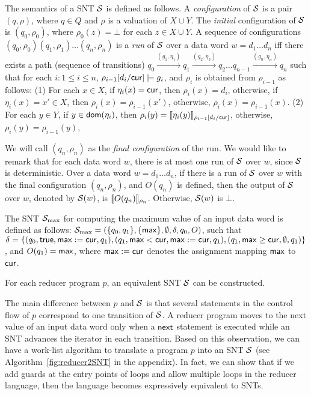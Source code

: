 The semantics of a SNT ${\mathcal{S} }$  is defined as follows. A \emph{configuration} of ${\mathcal{S} }$ is a pair $(q,\rho)$, where $q \in Q$ and $\rho$ is a valuation of $X \cup Y$. The \emph{initial} configuration of ${\mathcal{S} }$ is $(q_0,\rho_0)$, where $\rho_0(z)=\bot$ for each $z \in X\cup Y$.
A sequence of configurations $(q_0,\rho_0)(q_1,\rho_1)\ldots(q_n,\rho_n)$ is
a \emph{run} of ${\mathcal{S} }$ over a data word $w=d_1 \dots d_n$ iff there exists a path (sequence of transitions) $q_0 \xrightarrow{(g_1,\eta_1)} q_1 \xrightarrow{(g_2,\eta_2)} q_2 \dots q_{n-1} \xrightarrow{(g_n, \eta_n)} q_n$ such that for each $i: 1 \le i \le n$, $\rho_{i-1}[d_i/\mathsf{cur}] \models g_i$, and $\rho_i$ is obtained from $\rho_{i-1}$ as follows: (1) For each $x \in X$, if $\eta_i(x)=\mathsf{cur}$, then $\rho_i(x)=d_i$, otherwise, if $\eta_i(x)=x' \in X$, then $\rho_i(x)=\rho_{i-1}(x')$, otherwise, $\rho_i(x)=\rho_{i-1}(x)$. (2) For each $y \in Y$, if $y \in \mathsf{dom}(\eta_i)$, then $\rho_i(y)=\llbracket\eta_i(y)\rrbracket_{\rho_{i-1}[d_i/\mathsf{cur}]}$, otherwise, $\rho_i(y)=\rho_{i-1}(y)$,

We will call $(q_n,\rho_n)$ as the \emph{final configuration} of the run.
We would like to remark that for each data word $w$, there is at most one run of ${\mathcal{S} }$ over $w$, since ${\mathcal{S} }$ is deterministic. 
Over a data word $w = d_1 \dots d_n$, if there is a run of ${\mathcal{S} }$ over $w$ with the final configuration $(q_n,\rho_n)$, and $O(q_n)$ is defined, then the output of ${\mathcal{S} }$ over $w$, denoted by ${{\mathcal{S} }}(w)$, is $\llbracket O(q_n)\rrbracket_{\rho_n}$. Otherwise, ${{\mathcal{S} }}(w)$ is $\bot$.

\begin{example}
The SNT ${\mathcal{S} }_{\max}$ for computing the maximum value of an input data word is defined as follows: ${\mathcal{S} }_{\max}=(\{q_0,q_1\}, \{\mathsf{max}\}, \emptyset, \delta, q_0, O)$, such that $\delta = \{(q_0, \mathsf{true}, \mathsf{max}:=\mathsf{cur}, q_1), (q_1, \mathsf{max} < \mathsf{cur}, \mathsf{max}:=\mathsf{cur},q_1), (q_1, \mathsf{max} \ge \mathsf{cur}, \emptyset, q_1)\}$, and $O(q_1)=\mathsf{max}$, where $\mathsf{max}:=\mathsf{cur}$ denotes the assignment mapping $\mathsf{max}$ to $\mathsf{cur}$.
\end{example}
\begin{proposition}\label{prop-mrprog-to-snt}
For each reducer program $p$, an equivalent SNT ${\mathcal{S} }$ can be constructed.
\end{proposition}
The main difference between $p$ and ${\mathcal{S} }$ is that several statements in the control flow of $p$ correspond to one transition of ${\mathcal{S} }$. A reducer program moves to the next value of an input data word only when a $\mathsf{next}$ statement is executed while an SNT advances the iterator in each transition. Based on this observation, we can have a work-list algorithm to translate a program $p$ into an SNT ${\mathcal{S} }$ (see Algorithm~\ref{fig:reducer2SNT} in the appendix).
In fact, we can show that if we add guards at the entry points of loops and allow multiple loops in the reducer language, then the language becomes expressively equivalent to SNTs.

